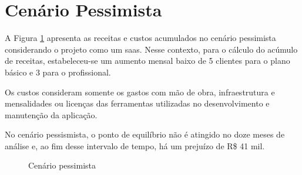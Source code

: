 \section{Cenário Pessimista}

A Figura \ref{fig:cenario-pessimista} apresenta as receitas e custos acumulados no cenário pessimista considerando o projeto como um \gls{saas}. Nesse contexto, para o cálculo do acúmulo de receitas, estabeleceu-se um aumento mensal baixo de 5 clientes para o plano básico e 3 para o profissional.

Os custos consideram somente os gastos com mão de obra, infraestrutura e mensalidades ou licenças das ferramentas utilizadas no desenvolvimento e manutenção da aplicação.

No cenário pessismista, o ponto de equilíbrio não é atingido no doze meses de análise e, ao fim desse intervalo de tempo, há um prejuízo de R\$ 41 mil.
\begin{figure}[h]
	\centering
	\caption{Cenário pessimista}
	\label{fig:cenario-pessimista}
\end{figure}